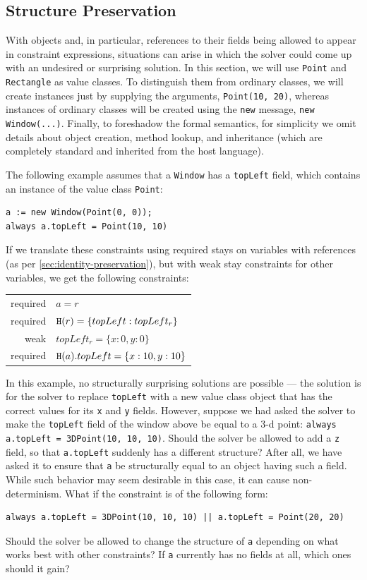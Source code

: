 \subsection{Structure Preservation}
With objects and, in particular, references to their fields being
allowed to appear in constraint expressions, situations can arise in
which the solver could come up with an undesired or surprising
solution. In this section, we will use \verb|Point| and
\verb|Rectangle| as value classes.  To distinguish them from ordinary
classes, we will create instances just by supplying the arguments,
\eg \verb|Point(10, 20)|, whereas instances of ordinary classes will
be created using the \verb|new| message, \eg \verb|new Window(...)|.
Finally, to foreshadow the formal semantics, for simplicity we omit
details about object creation, method lookup, and inheritance (which
are completely standard and inherited from the host language).

The following example assumes that a \verb!Window! has a
\verb!topLeft! field, which contains an instance of the value class
\verb!Point!:
\begin{lstlisting}
a := new Window(Point(0, 0));
always a.topLeft = Point(10, 10)
\end{lstlisting}

If we translate these constraints using required stays on variables
with references (as per \autoref{sec:identity-preservation}), but with
weak stay constraints for other variables, we get the following
constraints:
\begin{center}
\begin{tabular}{rl}
  required & $a = r$ \\
  required & $\texttt{\upshape H}(r) = \{topLeft: topLeft_r\}$\\
  weak & $topLeft_r = \{x: 0, y: 0\}$\\
  required & $\texttt{\upshape H}(a).topLeft = \{x: 10, y: 10\}$
\end{tabular}
\end{center}

In this example, no structurally surprising solutions are possible ---
the solution is for the solver to replace \verb!topLeft! with a new
value class object that has the correct values for its \verb!x! and
\verb!y! fields. However, suppose we had asked the solver to make the
\verb!topLeft!  field of the window above be equal to a 3-d point:
\verb!always a.topLeft = 3DPoint(10, 10, 10)!. Should the solver be
allowed to add a \verb!z! field, so that \verb!a.topLeft! suddenly has
a different structure? After all, we have asked it to ensure that
\verb!a! be structurally equal to an object having such a field. While
such behavior may seem desirable in this case, it can cause
non-determinism. What if the constraint is of the following form:
\begin{lstlisting}
always a.topLeft = 3DPoint(10, 10, 10) || a.topLeft = Point(20, 20)
\end{lstlisting}
Should the solver be allowed to change the structure of \verb!a!
depending on what works best with other constraints? If \verb!a!
currently has no fields at all, which ones should it gain?

